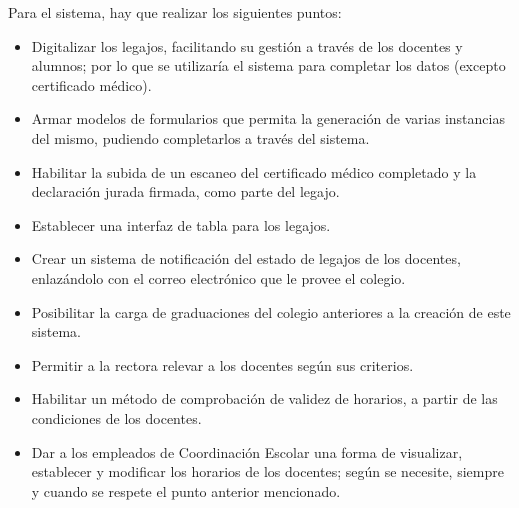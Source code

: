 \normalsize{ \indent
Para el sistema, hay que realizar los siguientes puntos:
}
\begin{itemize}
  \item Digitalizar los legajos, facilitando su gestión a través
  de los docentes y alumnos; por lo que se utilizaría el sistema
  para completar los datos (excepto certificado médico).
  \item Armar modelos de formularios que permita la generación de
  varias instancias del mismo, pudiendo completarlos a través del
  sistema.
  \item Habilitar la subida de un escaneo del certificado médico
  completado y la declaración jurada firmada, como parte del
  legajo.
  \item Establecer una interfaz de tabla para los legajos.
  \item Crear un sistema de notificación del estado de legajos de
  los docentes, enlazándolo con el correo electrónico que le
  provee el colegio.
  \item Posibilitar la carga de graduaciones del colegio anteriores
  a la creación de este sistema.
  \item Permitir a la rectora relevar a los docentes según sus
  criterios.
  \item Habilitar un método de comprobación de validez de horarios,
  a partir de las condiciones de los docentes.
  \item Dar a los empleados de Coordinación Escolar una forma de
  visualizar, establecer y modificar los horarios de los docentes;
  según se necesite, siempre y cuando se respete el punto anterior
  mencionado.
\end{itemize}
